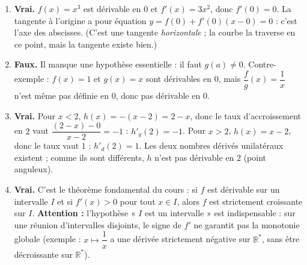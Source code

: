 \documentclass[11pt]{article}
\begin{document}
\begin{corrige}
\begin{enumerate}
    \item \textbf{Vrai.} $f(x)=x^3$ est dérivable en $0$ et $f'(x)=3x^2$, donc $f'(0)=0$. La tangente à l'origine a pour équation $y=f(0)+f'(0)(x-0)=0$ : c'est l'axe des abscisses. (C'est une tangente \emph{horizontale} ; la courbe la traverse en ce point, mais la tangente existe bien.)
    \item \textbf{Faux.} Il manque une hypothèse essentielle : il faut $g(a)\neq 0$. Contre-exemple : $f(x)=1$ et $g(x)=x$ sont dérivables en $0$, mais $\dfrac{f}{g}(x)=\dfrac{1}{x}$ n'est même pas définie en $0$, donc pas dérivable en $0$.
    \item \textbf{Vrai.} Pour $x<2$, $h(x)=-(x-2)=2-x$, donc le taux d'accroissement en $2$ vaut $\dfrac{(2-x)-0}{x-2}=-1$ : $h'_g(2)=-1$. Pour $x>2$, $h(x)=x-2$, donc le taux vaut $1$ : $h'_d(2)=1$. Les deux nombres dérivés unilatéraux existent ; comme ils sont différents, $h$ n'est pas dérivable en $2$ (point anguleux).
    \item \textbf{Vrai.} C'est le théorème fondamental du cours : si $f$ est dérivable sur un intervalle $I$ et si $f'(x)>0$ pour tout $x\in I$, alors $f$ est strictement croissante sur $I$. \textbf{Attention :} l'hypothèse « $I$ est un intervalle » est indispensable : sur une réunion d'intervalles disjoints, le signe de $f'$ ne garantit pas la monotonie globale (exemple : $x\mapsto \dfrac{1}{x}$ a une dérivée strictement négative sur $\mathbb{R}^*$, sans être décroissante sur $\mathbb{R}^*$).
\end{enumerate}
\end{corrige}
\end{document}
